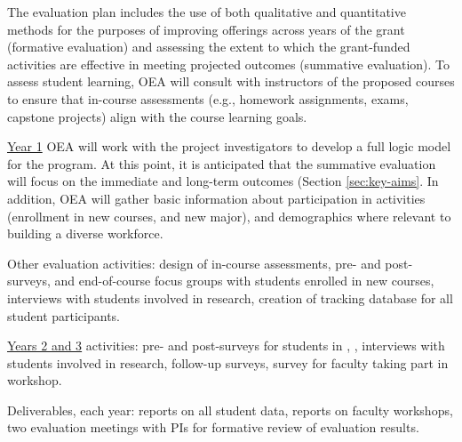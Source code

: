 The evaluation plan includes the use of both qualitative and
quantitative methods for the purposes of improving offerings across
years of the grant (formative evaluation) and assessing the extent to
which the grant-funded activities are effective in meeting projected
outcomes (summative evaluation).  To assess student learning, OEA will
consult with instructors of the proposed courses to ensure that
in-course assessments (e.g., homework assignments, exams, capstone
projects) align with the course learning goals.  


\underline{Year 1} OEA will work with the project investigators to
develop a full logic model for the program. At this point, it is
anticipated that the summative evaluation will focus on the immediate
and long-term outcomes (Section \ref{sec:key-aims}.  In addition, OEA
will gather basic information about participation in activities
(enrollment in new courses, and new major), and demographics where
relevant to building a diverse workforce.

Other evaluation activities: design of in-course assessments, pre- and
post-surveys, and end-of-course focus groups with students enrolled in
new courses, interviews with students involved in research, creation
of tracking database for all student participants.

\underline{Years 2 and 3} activities: pre- and post-surveys for
students in \statcl, \astrocl, interviews with students involved in
research, follow-up surveys, survey for faculty taking part in
workshop.  

Deliverables, each year: reports on all student data, reports on
faculty workshops, two evaluation meetings with PIs for formative
review of evaluation results.

